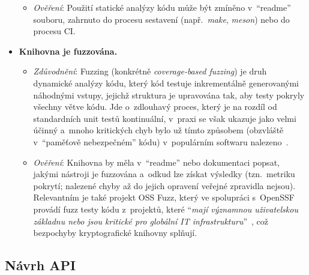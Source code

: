 \begin{itemize}
\begin{itemize}[beginpenalty=10000]
        \item \textit{Ověření}: Použití statické analýzy kódu může být zmíněno v~``readme'' souboru, zahrnuto do procesu sestavení (např.\ \textit{make}, \textit{meson}) nebo do procesu CI.
    \end{itemize}
    
    \item \textbf{Knihovna je fuzzována.} 
    \begin{itemize}[beginpenalty=10000]
        \item \textit{Zdůvodnění}: Fuzzing (konkrétně \textit{coverage-based fuzzing}) je druh dynamické analýzy kódu, který kód testuje inkrementálně generovanými náhodnými vstupy, jejichž struktura je upravována tak, aby testy pokryly všechny větve kódu. Jde o~zdlouhavý proces, který je na rozdíl od standardních unit testů kontinuální, v~praxi se však ukazuje jako velmi účinný a~mnoho kritických chyb bylo už tímto způsobem (obzvláště v~``paměťově nebezpečném'' kódu) v~populárním softwaru nalezeno~\cite{linux414}.

        \item \textit{Ověření}: Knihovna by měla v~``readme'' nebo dokumentaci popsat, jakými nástroji je fuzzována a~odkud lze získat výsledky (tzn.~metriku pokrytí; nalezené chyby až do jejich opravení veřejné zpravidla nejsou). Relevantním je také projekt OSS Fuzz, který ve spolupráci s~OpenSSF provádí fuzz testy kódu z~projektů, které ``\textit{mají významnou uživatelskou základnu nebo jsou kritické pro globální IT infrastrukturu}''~\cite{ossfuzz-gs}, což bezpochyby kryptografické knihovny splňují.
    \end{itemize}
\end{itemize}

\subsection{Návrh API}

